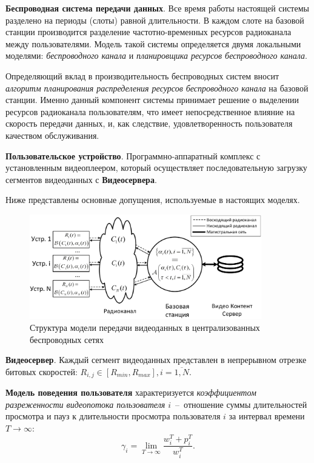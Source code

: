 \textbf{Беспроводная система передачи данных}. Все время работы настоящей системы разделено на периоды (слоты) равной длительности. В каждом слоте на базовой станции производится разделение частотно-временных ресурсов радиоканала между пользователями. Модель такой системы определяется двумя локальными моделями: \textit{беспроводного канала} и \textit{планировщика ресурсов беспроводного канала}.

Определяющий вклад в производительность беспроводных систем вносит \textit{алгоритм планирования распределения ресурсов беспроводного канала} на базовой станции. Именно данный компонент системы принимает решение о выделении ресурсов радиоканала пользователям, что имеет непосредственное влияние на скорость передачи данных, и, как следствие, удовлетворенность пользователя качеством обслуживания.

\textbf{Пользовательское устройство}. Программно-аппаратный комплекс с установленным видеоплеером, который осуществляет последовательную загрузку сегментов видеоданных с \textbf{Видеосервера}.

Ниже представлены основные допущения, используемые в настоящих моделях.

\begin{figure}[htbp]
\begin{center}
\includegraphics[width=0.9\textwidth]{../Dissertation/images/Chapter2/SystemModelEch.pdf}
\caption{Структура модели передачи видеоданных в централизованных беспроводных сетях}
\label{fig:SystemModel}
\end{center}
\end{figure}

\textbf{Видеосервер}. Каждый сегмент видеоданных представлен в непрерывном отрезке битовых скоростей: $R_{i,j} \in [R_{min}, R_{max}], i=\overline{1,N}$.

\textbf{Модель поведения пользователя} характеризуется \textit{коэффициентом разреженности видеопотока пользователя $i$}~--~отношение суммы длительностей просмотра и пауз к длительности просмотра пользователя $i$ за интервал времени $T\rightarrow\infty$:
$$\gamma_i = \lim\limits_{T\rightarrow\infty} \frac{w_i^T + p_i^T}{w_i^T}.$$

